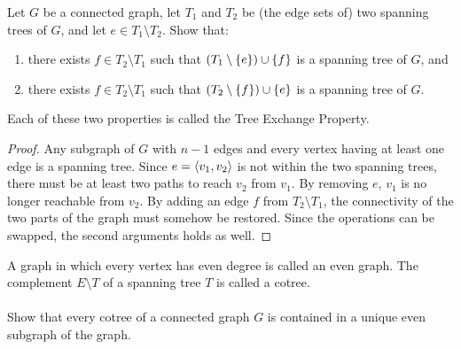 \documentclass{article}
\begin{document}
\begin{exercise}
Let $G$ be a connected graph, let $T_1$ and $T_2$ be (the edge sets of) two spanning trees of $G$, and let $e\in T_1\setminus T_2$. Show that:
\begin{enumerate}
 \item there exists $f\in T_2\setminus T_1$ such that $\left( T_1\setminus\left\{ e \right\} \right)\cup\left\{ f \right\}$ is a spanning tree of $G$, and
 \item there exists $f\in T_2\setminus T_1$ such that $\left( T_2\setminus\left\{ f \right\} \right)\cup\left\{ e \right\}$ is a spanning tree of $G$.
\end{enumerate}
\begin{note}
Each of these two properties is called the Tree Exchange Property.
\end{note}
\begin{answer}
\begin{proof}
Any subgraph of $G$ with $n-1$ edges and every vertex having at least one edge is a spanning tree. Since $e=\left\langle v_1,v_2 \right\rangle$ is not within the two spanning trees, there must be at least two paths to reach $v_2$ from $v_1$. By removing $e$, $v_1$ is no longer reachable from $v_2$. By adding an edge $f$ from $T_2\setminus T_1$, the connectivity of the two parts of the graph must somehow be restored. Since the operations can be swapped, the second arguments holds as well.
\end{proof}
\end{answer}
\end{exercise}

\begin{exercise}
A graph in which every vertex has even degree is called an even graph. The complement $E\setminus T$ of a spanning tree $T$ is called a cotree.
\paragraph{}
Show that every cotree of a connected graph $G$ is contained in a unique even subgraph of the graph.
\begin{answer}

\end{answer}
\end{exercise}
\end{document}
